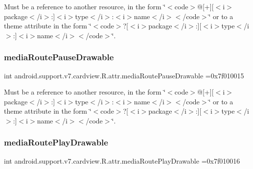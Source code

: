 Must be a reference to another resource, in the form \char`\"{}$<$code$>$@\mbox{[}+\mbox{]}\mbox{[}$<$i$>$package$<$/i$>$\+:\mbox{]}$<$i$>$type$<$/i$>$\+:$<$i$>$name$<$/i$>$$<$/code$>$\char`\"{} or to a theme attribute in the form \char`\"{}$<$code$>$?\mbox{[}$<$i$>$package$<$/i$>$\+:\mbox{]}\mbox{[}$<$i$>$type$<$/i$>$\+:\mbox{]}$<$i$>$name$<$/i$>$$<$/code$>$\char`\"{}. \mbox{\label{classandroid_1_1support_1_1v7_1_1cardview_1_1R_1_1attr_a37dd4d368db06e40a8237aaeed55bba9}} 
\subsubsection{\texorpdfstring{media\+Route\+Pause\+Drawable}{mediaRoutePauseDrawable}}
{\footnotesize\ttfamily int android.\+support.\+v7.\+cardview.\+R.\+attr.\+media\+Route\+Pause\+Drawable =0x7f010015\hspace{0.3cm}{\ttfamily [static]}}

Must be a reference to another resource, in the form \char`\"{}$<$code$>$@\mbox{[}+\mbox{]}\mbox{[}$<$i$>$package$<$/i$>$\+:\mbox{]}$<$i$>$type$<$/i$>$\+:$<$i$>$name$<$/i$>$$<$/code$>$\char`\"{} or to a theme attribute in the form \char`\"{}$<$code$>$?\mbox{[}$<$i$>$package$<$/i$>$\+:\mbox{]}\mbox{[}$<$i$>$type$<$/i$>$\+:\mbox{]}$<$i$>$name$<$/i$>$$<$/code$>$\char`\"{}. \mbox{\label{classandroid_1_1support_1_1v7_1_1cardview_1_1R_1_1attr_a512e993917ec21dd61380d55022898ce}} 
\subsubsection{\texorpdfstring{media\+Route\+Play\+Drawable}{mediaRoutePlayDrawable}}
{\footnotesize\ttfamily int android.\+support.\+v7.\+cardview.\+R.\+attr.\+media\+Route\+Play\+Drawable =0x7f010016\hspace{0.3cm}{\ttfamily [static]}}

